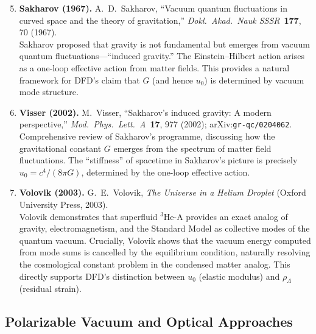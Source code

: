 \documentclass[11pt]{article}
\theoremstyle{plain}
\theoremstyle{definition}
\theoremstyle{remark}
\begin{document}
\begin{enumerate}
\setcounter{enumi}{4}

\item \textbf{Sakharov (1967).}
A.~D.~Sakharov, ``Vacuum quantum fluctuations in curved space and the
theory of gravitation,'' \textit{Dokl.\ Akad.\ Nauk SSSR}\ \textbf{177},
70 (1967).\\
Sakharov proposed that gravity is not fundamental but emerges from vacuum
quantum fluctuations---``induced gravity.'' The Einstein--Hilbert action
arises as a one-loop effective action from matter fields. This provides
a natural framework for DFD's claim that $G$ (and hence $u_0$) is
determined by vacuum mode structure.

\item \textbf{Visser (2002).}
M.~Visser, ``Sakharov's induced gravity: A modern perspective,''
\textit{Mod.\ Phys.\ Lett.\ A}\ \textbf{17}, 977 (2002);
arXiv:\texttt{gr-qc/0204062}.\\
Comprehensive review of Sakharov's programme, discussing how the
gravitational constant $G$ emerges from the spectrum of matter field
fluctuations. The ``stiffness'' of spacetime in Sakharov's picture is
precisely $u_0 = c^4/(8\pi G)$, determined by the one-loop effective
action.

\item \textbf{Volovik (2003).}
G.~E.~Volovik, \textit{The Universe in a Helium Droplet} (Oxford
University Press, 2003).\\
Volovik demonstrates that superfluid $^3$He-A provides an exact analog
of gravity, electromagnetism, and the Standard Model as collective modes
of the quantum vacuum. Crucially, Volovik shows that the vacuum energy
computed from mode sums is cancelled by the equilibrium condition,
naturally resolving the cosmological constant problem in the condensed
matter analog. This directly supports DFD's distinction between $u_0$
(elastic modulus) and $\rho_\Lambda$ (residual strain).

\end{enumerate}

\subsection{Polarizable Vacuum and Optical Approaches}
\end{document}
